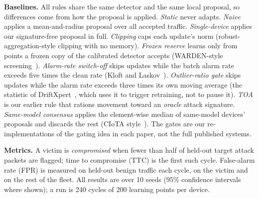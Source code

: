 \textbf{Baselines.} All rules share the same detector and the same local proposal, so differences come
from how the proposal is applied. \emph{Static} never adapts. \emph{Naive} applies a mean-and-radius
proposal over all accepted traffic. \emph{Single-device} applies our signature-free proposal in full.
\emph{Clipping} caps each update's norm (robust-aggregation-style clipping with no memory).
\emph{Frozen reserve} learns only from points a frozen copy of the calibrated detector accepts
(WARDEN-style screening~\cite{warden}). \emph{Alarm-rate switch-off} skips updates while the batch alarm
rate exceeds five times the clean rate (Kloft and Laskov~\cite{kloft}). \emph{Outlier-ratio gate} skips
updates while the alarm rate exceeds three times its own moving average (the statistic of DriftXpert~\cite{driftxpert}, which uses it to trigger retraining, not to pause it).
\emph{TOA} is our earlier rule that rations movement toward an \emph{oracle} attack signature.
\emph{Same-model consensus} applies the element-wise median of same-model devices' proposals and discards
the rest (CIoTA style~\cite{ciota}). The gates are our re-implementations of the gating idea in each
paper, not the full published systems.

\textbf{Metrics.} A victim is \emph{compromised} when fewer than half of held-out target attack packets
are flagged; time to compromise (TTC) is the first such cycle. False-alarm rate (FPR) is measured on
held-out benign traffic each cycle, on the victim and on the rest of the fleet. All results are over 10
seeds (95\% confidence intervals where shown); a run is 240 cycles of 200 learning points per device.
